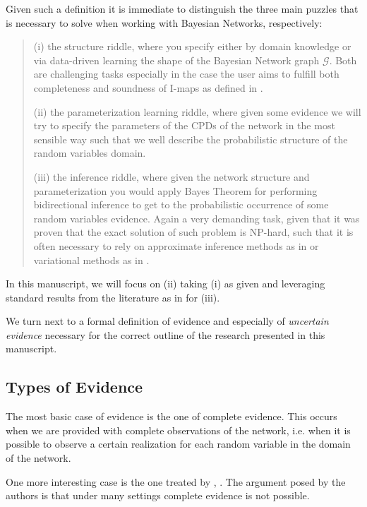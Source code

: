 \documentclass[11pt]{article}
\begin{document}
\begin{article}
Given such a definition it is immediate to distinguish the three
main puzzles that is necessary to solve when working with Bayesian
Networks, respectively:

\begin{quote}
(i) the structure riddle, where you specify either by domain knowledge
or via data-driven learning the shape of the Bayesian Network graph
\(\mathscr{G}\). Both are challenging tasks especially in the case
the user aims to fulfill both completeness and soundness of I-maps
as defined in \cite{koller2009probabilistic}.

(ii) the parameterization learning riddle, where given some
evidence we will try to specify the parameters of the CPDs of the
network in the most sensible way such that we well describe the
probabilistic structure of the random variables domain.

(iii) the inference riddle, where given the network structure and
parameterization you would apply Bayes Theorem for performing
bidirectional inference to get to the probabilistic occurrence of
some random variables evidence. Again a very demanding task, given
that it was proven that the exact solution of such problem is NP-hard,
such that it is often necessary to rely on approximate inference
methods as in \cite{pearl1987evidential} or variational methods as in
\cite{jordan1999introduction}.
\end{quote}


In this manuscript, we will focus on (ii) taking (i) as given and
leveraging standard results from the literature as in
\cite{koller2009probabilistic} for (iii).

We turn next to a formal definition of evidence and especially of
\emph{uncertain evidence} necessary for the correct outline of the
research presented in this manuscript.

\subsection{Types of Evidence}
\label{sec:org8f8308f}

The most basic case of evidence is the one of complete
evidence. This occurs when we are provided with complete
observations of the network, i.e.  when it is possible to observe a
certain realization for each random variable in the domain of the
network.

One more interesting case is the one treated by \cite{Mrad_2015},
\cite{Wasserkrug_all}. The argument posed by the authors is that under
many settings complete evidence is not possible.


\end{article}
\end{document}
